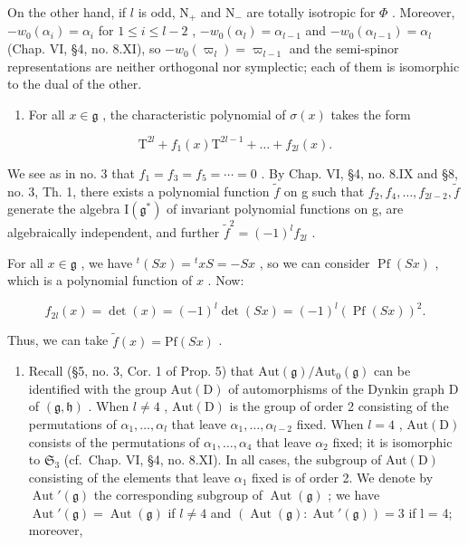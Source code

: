 On the other hand, if \(l\) is odd, \(\mathrm{N}_{+}\) and \(\mathrm{N}_{-}\) are totally isotropic for \(\varPhi\) . Moreover, \(-w_{0}(\alpha_{i}) = \alpha_{i}\) for \(1 \leq i \leq l - 2\) , \(-w_{0}(\alpha_{l}) = \alpha_{l - 1}\) and \(-w_{0}(\alpha_{l - 1}) = \alpha_{l}\) (Chap. VI, §4, no. 8.XI), so \(-w_{0}(\varpi_{l}) = \varpi_{l - 1}\) and the semi-spinor representations are neither orthogonal nor symplectic; each of them is isomorphic to the dual of the other.

\begin{enumerate}
\def\labelenumi{(\Roman{enumi})}
\setcounter{enumi}{5}
\tightlist
\item
  For all \(x \in \mathfrak{g}\) , the characteristic polynomial of \(\sigma(x)\) takes the form
\end{enumerate}

\[
\mathrm{T} ^ {2 l} + f _ {1} (x) \mathrm{T} ^ {2 l - 1} + \dots + f _ {2 l} (x).
\]

We see as in no. 3 that \(f_{1}=f_{3}=f_{5}=\cdots=0\) . By Chap. VI, §4, no. 8.IX and §8, no. 3, Th. 1, there exists a polynomial function \(\tilde{f}\) on g such that \(f_{2}, f_{4}, \ldots, f_{2l-2}, \tilde{f}\) generate the algebra \(\mathrm{I}(\mathfrak{g}^{*})\) of invariant polynomial functions on g, are algebraically independent, and further \(\tilde{f}^{2}=(-1)^{l}f_{2l}\) .

For all \(x \in \mathfrak{g}\) , we have \({}^t(Sx) = {}^t xS = -Sx\) , so we can consider \(\operatorname{Pf}(Sx)\) , which is a polynomial function of \(x\) . Now:

\[
f _ {2 l} (x) = \det (x) = (- 1) ^ {l} \det (S x) = (- 1) ^ {l} (\operatorname{Pf} (S x)) ^ {2}.
\]

Thus, we can take \(\tilde{f}(x) = \mathrm{Pf}(Sx)\) .

\begin{enumerate}
\def\labelenumi{(\Roman{enumi})}
\setcounter{enumi}{6}
\tightlist
\item
  Recall (§5, no. 3, Cor. 1 of Prop. 5) that \(\mathrm{Aut}(\mathfrak{g}) / \mathrm{Aut}_0(\mathfrak{g})\) can be identified with the group \(\mathrm{Aut}(\mathrm{D})\) of automorphisms of the Dynkin graph D of \((\mathfrak{g},\mathfrak{h})\) . When \(l\neq 4\) , \(\mathrm{Aut}(\mathrm{D})\) is the group of order 2 consisting of the permutations of \(\alpha_{1},\ldots ,\alpha_{l}\) that leave \(\alpha_{1},\ldots ,\alpha_{l - 2}\) fixed. When \(l = 4\) , \(\mathrm{Aut}(\mathrm{D})\) consists of the permutations of \(\alpha_{1},\ldots ,\alpha_{4}\) that leave \(\alpha_{2}\) fixed; it is isomorphic to \(\mathfrak{S}_3\) (cf.~Chap. VI, §4, no. 8.XI). In all cases, the subgroup of \(\mathrm{Aut}(\mathrm{D})\) consisting of the elements that leave \(\alpha_{1}\) fixed is of order 2. We denote by \(\operatorname{Aut}'(\mathfrak{g})\) the corresponding subgroup of \(\operatorname{Aut}(\mathfrak{g})\) ; we have \(\operatorname{Aut}'(\mathfrak{g}) = \operatorname{Aut}(\mathfrak{g})\) if \(l \neq 4\) and \((\operatorname{Aut}(\mathfrak{g}) : \operatorname{Aut}'(\mathfrak{g})) = 3\) if l = 4; moreover,
\end{enumerate}

